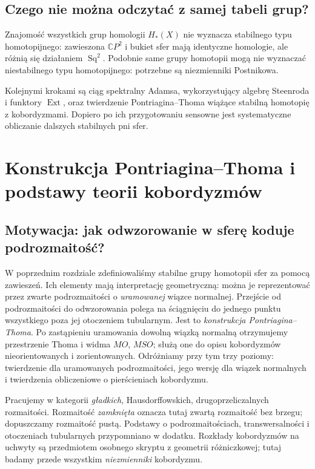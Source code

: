 \documentclass[11pt,a4paper,oneside]{report}
\newcommand{\C}{\mathbb{C}}
\theoremstyle{plain}
\theoremstyle{definition}
\theoremstyle{remark}
\begin{document}
\section{Czego nie można odczytać z samej tabeli grup?}
Znajomość wszystkich grup homologii $H_*(X)$ nie
wyznacza stabilnego typu homotopijnego: zawieszona
$\C P^2$ i bukiet sfer mają identyczne homologie,
ale różnią się działaniem $\operatorname{Sq}^2$.
Podobnie same grupy homotopii mogą nie wyznaczać
niestabilnego typu homotopijnego: potrzebne są
niezmienniki Postnikowa.

Kolejnymi krokami są ciąg spektralny Adamsa,
wykorzystujący algebrę Steenroda i funktory $\operatorname{Ext}$,
oraz twierdzenie Pontriagina--Thoma wiążące
stabilną homotopię z kobordyzmami. Dopiero po ich
przygotowaniu sensowne jest systematyczne
obliczanie dalszych stabilnych pni sfer.

\chapter{Konstrukcja Pontriagina--Thoma i podstawy teorii kobordyzmów}
\label{ch:pt-v9}

\section{Motywacja: jak odwzorowanie w sferę koduje podrozmaitość?}
W poprzednim rozdziale zdefiniowaliśmy stabilne grupy homotopii sfer
za pomocą zawieszeń. Ich elementy mają interpretację geometryczną:
można je reprezentować przez zwarte podrozmaitości o \emph{uramowanej}
wiązce normalnej. Przejście od podrozmaitości do odwzorowania
polega na ściągnięciu do jednego punktu wszystkiego poza jej
otoczeniem tubularnym. Jest to \emph{konstrukcja Pontriagina--Thoma}.
Po zastąpieniu uramowania dowolną wiązką normalną otrzymujemy
przestrzenie Thoma i widma $MO$, $MSO$; służą one do opisu
kobordyzmów nieorientowanych i zorientowanych. Odróżniamy przy tym
trzy poziomy: twierdzenie dla uramowanych podrozmaitości,
jego wersję dla wiązek normalnych i twierdzenia obliczeniowe
o pierścieniach kobordyzmu.

Pracujemy w kategorii \emph{gładkich}, Hausdorffowskich,
drugoprzeliczalnych rozmaitości. Rozmaitość \emph{zamknięta}
oznacza tutaj zwartą rozmaitość bez brzegu; dopuszczamy
rozmaitość pustą. Podstawy o podrozmaitościach, transwersalności
i otoczeniach tubularnych przypomniano w dodatku. Rozkłady
kobordyzmów na uchwyty są przedmiotem osobnego skryptu z geometrii
różniczkowej; tutaj badamy przede wszystkim \emph{niezmienniki}
kobordyzmu.
\end{document}
